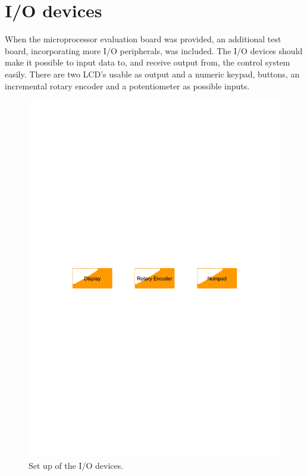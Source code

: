 \section{I/O devices}\label{sec:iodevices}
When the microprocessor evaluation board was provided, an additional test board, incorporating more I/O peripherals, was included. The I/O devices should make it possible to input data to, and receive output from, the control system easily. There are two LCD's usable as output and a numeric keypad, buttons, an incremental rotary encoder and a potentiometer as possible inputs.
\begin{figure}[htb]
	\centering
	\includegraphics[scale=0.6,clip,trim=00 400 00 400]{graphics/iodevices} %
	\caption{Set up of the I/O devices.}
	\label{fig:iodevices}			%
\end{figure}


